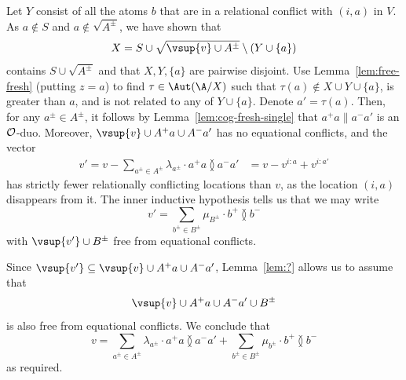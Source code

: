 \begin{claimproof}
   Let $Y$ consist of all the atoms $b$ that are in a relational conflict with $(i,a)$ in $V$. 
   As $a \not\in S$ and $a \not\in \sqrt{A^\pm}$, we have shown that
   \[
X = S \cup \sqrt{\vsup{v} \cup A^\pm} \setminus (Y \cup \{a\})   
\]
contains $S \cup \sqrt{A^\pm}$ and that $X, Y, \{a\}$ are pairwise disjoint.
Use Lemma~\ref{lem:free-fresh} (putting $z=a$) to find $\tau \in \Aut(\A/X)$ such that $\tau(a) \not\in X \cup Y \cup \{a\}$, is greater than $a$, and is not related to any of $Y \cup \{a\}$. Denote $a'=\tau(a)$.
Then, for any $a^\pm \in A^\pm$, it follows by Lemma~\ref{lem:cog-fresh-single} that $a^+ a \parallel a^- a'$ is an $\cal O$-duo. Moreover, 
$\vsup{v} \cup A^+ a \cup A^- a'$
has no equational conflicts, and the vector
\begin{align*}
    v' = v - \sum_{a^\pm\in A^\pm} \lambda_{a^\pm} \cdot a^+ a \between a^- a'
    &= v -  v^{i:a} + v^{i:a'}%
\end{align*}
has strictly fewer relationally conflicting locations than $v$, as the location $(i,a)$ disappears from it.
The inner inductive hypothesis tells us 
that we may write
\[
v' = \sum_{b^\pm\in B^\pm} \mu_{B^\pm} \cdot b^+ \between b^-
\]
with $\vsup{v'} \cup B^\pm$ free from equational conflicts.

Since $\vsup{v'} \subseteq \vsup{v} \cup A^+ a \cup A^- a'$, Lemma~\ref{lem:?} allows us to assume that 
\[
    \vsup{v} \cup A^+ a \cup A^-a' \cup B^\pm
\]
is also free from equational conflicts. We conclude that 
\[
    v =\sum_{a^\pm\in A^\pm} \lambda_{a^\pm} \cdot a^+ a \between a^-a'+ \sum_{b^\pm\in B^\pm} \mu_{b^\pm} \cdot b^+ \between b^-
\]
as required.
\end{claimproof}

